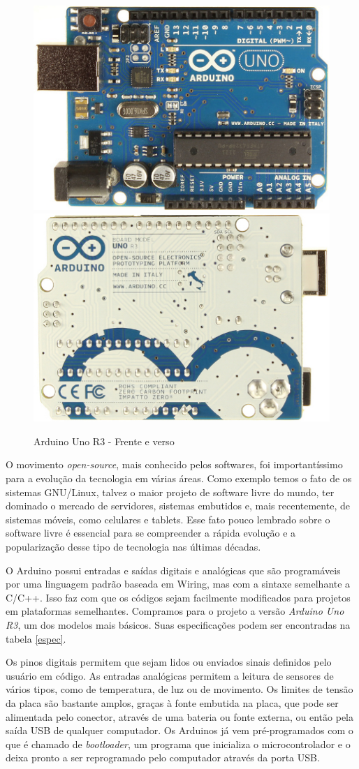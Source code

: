 \documentclass[a4paper,12pt]{article}
\begin{document}
\begin{figure}[H]
\centering
\includegraphics[width=.35\textwidth]{img/arduino1.jpg}
\includegraphics[width=.35\textwidth]{img/arduino2.jpg}
\caption{Arduino Uno R3 - Frente e verso}
\end{figure} 
 
O movimento \textit{open-source}, mais conhecido pelos softwares, foi importantíssimo para a evolução da tecnologia em várias áreas. Como exemplo temos o fato de os sistemas GNU/Linux, talvez o maior projeto de software livre do mundo, ter dominado o mercado de servidores, sistemas embutidos e, mais recentemente, de sistemas móveis, como celulares e tablets. Esse fato pouco lembrado sobre o software livre é essencial para se compreender a rápida evolução e a popularização desse tipo de tecnologia nas últimas décadas.
 
 O Arduino possui entradas e saídas digitais e analógicas que são programáveis por uma linguagem padrão baseada em Wiring, mas com a sintaxe semelhante a C/C++. Isso faz com que os códigos sejam facilmente modificados para projetos em plataformas semelhantes. Compramos para o projeto a versão \textit{Arduino Uno R3}, um dos modelos mais básicos. Suas especificações podem ser encontradas na tabela \ref{espec}.
 
 Os pinos digitais permitem que sejam lidos ou enviados sinais definidos pelo usuário em código. As entradas analógicas permitem a leitura de sensores de vários tipos, como de temperatura, de luz ou de movimento. Os limites de tensão da placa são bastante amplos, graças à fonte embutida na placa, que pode ser alimentada pelo conector, através de uma bateria ou fonte externa, ou então pela saída USB de qualquer computador. Os Arduinos já vem pré-programados com o que é chamado de \textit{bootloader}, um programa que inicializa o microcontrolador e o deixa pronto a ser reprogramado pelo computador através da porta USB.
 
\end{document}

